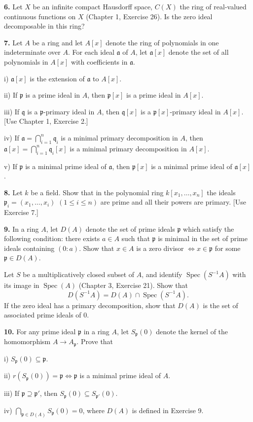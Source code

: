 \noindent\textbf{6.} Let \(X\) be an infinite compact Hausdorff space, \(C(X)\) the ring of real-valued continuous functions on \(X\) (Chapter 1, Exercise 26). Is the zero ideal decomposable in this ring?

\noindent\textbf{7.} Let \(A\) be a ring and let \(A[x]\) denote the ring of polynomials in one indeterminate over \(A\). For each ideal \(\mathfrak a\) of \(A\), let \(\mathfrak a[x]\) denote the set of all polynomials in \(A[x]\) with coefficients in \(\mathfrak a\).

i) \(\mathfrak a[x]\) is the extension of \(\mathfrak a\) to \(A[x]\).

ii) If \(\mathfrak p\) is a prime ideal in \(A\), then \(\mathfrak p[x]\) is a prime ideal in \(A[x]\).

iii) If \(\mathfrak q\) is a \(\mathfrak p\)-primary ideal in \(A\), then \(\mathfrak q[x]\) is a \(\mathfrak p[x]\)-primary ideal in \(A[x]\). [Use Chapter 1, Exercise 2.]

iv) If \(\mathfrak a=\bigcap_{i=1}^n\mathfrak q_i\) is a minimal primary decomposition in \(A\), then \(\mathfrak a[x]=\bigcap_{i=1}^n\mathfrak q_i[x]\) is a minimal primary decomposition in \(A[x]\).

v) If \(\mathfrak p\) is a minimal prime ideal of \(\mathfrak a\), then \(\mathfrak p[x]\) is a minimal prime ideal of \(\mathfrak a[x]\).

\noindent\textbf{8.} Let \(k\) be a field. Show that in the polynomial ring \(k[x_1,\ldots,x_n]\) the ideals \(\mathfrak p_i=(x_1,\ldots,x_i)\) \((1\leq i\leq n)\) are prime and all their powers are primary. [Use Exercise 7.]

\noindent\textbf{9.} In a ring \(A\), let \(D(A)\) denote the set of prime ideals \(\mathfrak p\) which satisfy the following condition: there exists \(a\in A\) such that \(\mathfrak p\) is minimal in the set of prime ideals containing \((0:a)\). Show that \(x\in A\) is a zero divisor \(\Longleftrightarrow x\in\mathfrak p\) for some \(\mathfrak p\in D(A)\).

Let \(S\) be a multiplicatively closed subset of \(A\), and identify \(\operatorname{Spec}(S^{-1}A)\) with its image in \(\operatorname{Spec}(A)\) (Chapter 3, Exercise 21). Show that
\[
D(S^{-1}A)=D(A)\cap\operatorname{Spec}(S^{-1}A).
\]
If the zero ideal has a primary decomposition, show that \(D(A)\) is the set of associated prime ideals of 0.

\noindent\textbf{10.} For any prime ideal \(\mathfrak p\) in a ring \(A\), let \(S_\mathfrak p(0)\) denote the kernel of the homomorphism \(A\to A_\mathfrak p\). Prove that

i) \(S_\mathfrak p(0)\subseteq\mathfrak p\).

ii) \(r(S_\mathfrak p(0))=\mathfrak p\Longleftrightarrow\mathfrak p\) is a minimal prime ideal of \(A\).

iii) If \(\mathfrak p\supseteq\mathfrak p'\), then \(S_\mathfrak p(0)\subseteq S_{\mathfrak p'}(0)\).

iv) \(\bigcap_{\mathfrak p\in D(A)}S_\mathfrak p(0)=0\), where \(D(A)\) is defined in Exercise 9.
